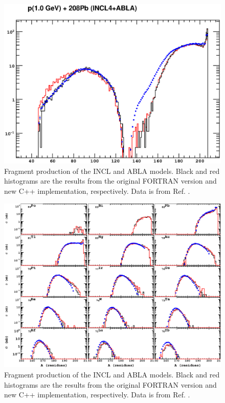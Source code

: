 \documentclass[a4paper]{jpconf}
\begin{document}
\begin{figure}[h]
\begin{center}
\includegraphics[scale=0.70]{poster/images/fragments.eps}

\caption{Fragment production of the INCL and ABLA \cite{abla, abla1, abla2} models. 
Black and red histograms are the results from the original FORTRAN version 
and new C++ implementation, respectively. Data is from Ref. \cite{gsifragments}.}

\end{center}
\end{figure}


\begin{figure}[h]
\begin{center}
\includegraphics[scale=0.60]{poster/images/pPbIsotopes.eps}

\caption{Fragment production of the INCL and ABLA \cite{abla, abla1, abla2} models. 
Black and red histograms are the results from the original FORTRAN version 
and new C++ implementation, respectively. Data is from Ref. \cite{gsifragments}.}

\end{center}
\end{figure}
\end{document}
